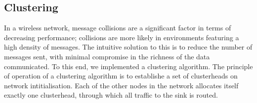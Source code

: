 \begin{figure}[ht!]
\centering
{}

\end{figure}


\subsection{Clustering}

In a wireless network, message collisions are a significant factor in terms of decreasing performance; collisions are more likely in environments featuring a high density of messages. The intuitive solution to this is to reduce the number of messages sent, with minimal compromise in the richness of the data communicated. To this end, we implemented a clustering algorithm. The principle of operation of a clustering algorithm is to establishe a set of clusterheads on network intitialisation. Each of the other nodes in the network allocates itself exactly one clusterhead, through which all traffic to the sink is routed.

